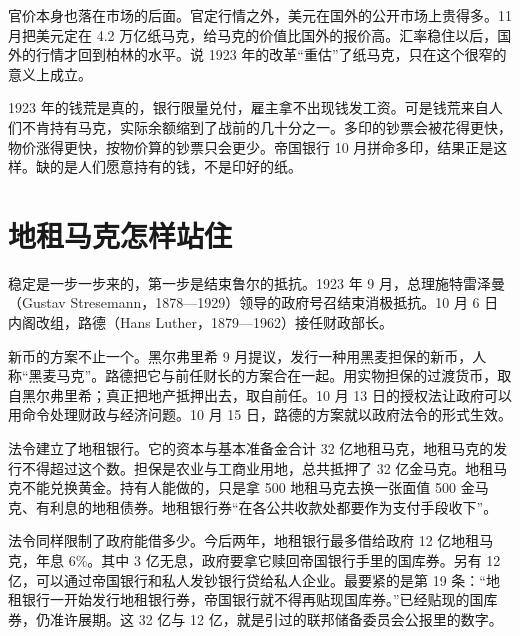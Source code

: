 官价本身也落在市场的后面。官定行情之外，美元在国外的公开市场上贵得多\cite{bresciani1937}。11 月把美元定在 4.2 万亿纸马克，给马克的价值比国外的报价高。汇率稳住以后，国外的行情才回到柏林的水平\cite{bresciani1937}。说 1923 年的改革“重估”了纸马克，只在这个很窄的意义上成立。

\begin{pitfall}
1923 年的钱荒是真的，银行限量兑付，雇主拿不出现钱发工资。可是钱荒来自人们不肯持有马克，实际余额缩到了战前的几十分之一。多印的钞票会被花得更快，物价涨得更快，按物价算的钞票只会更少。帝国银行 10 月拼命多印，结果正是这样。缺的是人们愿意持有的钱，不是印好的纸。
\end{pitfall}

\section{地租马克怎样站住}\label{sec:weimar-stabilization}

稳定是一步一步来的，第一步是结束鲁尔的抵抗。1923 年 9 月，总理施特雷泽曼（Gustav Stresemann，1878—1929）领导的政府号召结束消极抵抗\cite{bundesarchiv1923b,nobelohlin}。10 月 6 日内阁改组，路德（Hans Luther，1879—1962）接任财政部长\cite{luther1987}。

新币的方案不止一个。黑尔弗里希 9 月提议，发行一种用黑麦担保的新币，人称“黑麦马克”\cite{helfferich1969}。路德把它与前任财长的方案合在一起。用实物担保的过渡货币，取自黑尔弗里希；真正把地产抵押出去，取自前任\cite{luther1987}。10 月 13 日的授权法让政府可以用命令处理财政与经济问题。10 月 15 日，路德的方案就以政府法令的形式生效\cite{luther1987}。

法令建立了地租银行。它的资本与基本准备金合计 32 亿地租马克，地租马克的发行不得超过这个数\cite{renten1923}。担保是农业与工商业用地，总共抵押了 32 亿金马克\cite{luther1987}。地租马克不能兑换黄金。持有人能做的，只是拿 500 地租马克去换一张面值 500 金马克、有利息的地租债券\cite{renten1923}。地租银行券“在各公共收款处都要作为支付手段收下”\cite{renten1923}。

法令同样限制了政府能借多少。今后两年，地租银行最多借给政府 12 亿地租马克，年息 6\%。其中 3 亿无息，政府要拿它赎回帝国银行手里的国库券\cite{renten1923}。另有 12 亿，可以通过帝国银行和私人发钞银行贷给私人企业\cite{renten1923}。最要紧的是第 19 条：“地租银行一开始发行地租银行券，帝国银行就不得再贴现国库券。”已经贴现的国库券，仍准许展期\cite{renten1923}。这 32 亿与 12 亿，就是引过的联邦储备委员会公报里的数字\cite{frb1923}。

